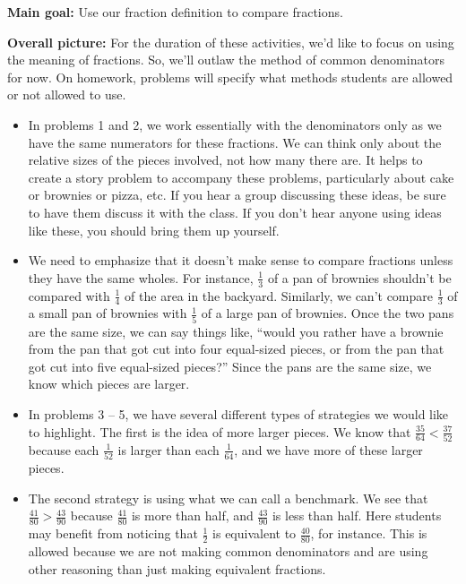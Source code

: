 \documentclass[nooutcomes,noauthor]{ximera}
\begin{document}
\newpage

\begin{instructorNotes} 



{\bf Main goal:} Use our fraction definition to compare fractions.

{\bf Overall picture:} For the duration of these activities, we'd like to focus on using the meaning of fractions. So, we'll outlaw  the method of common denominators for now. On homework, problems will specify what methods students are allowed or not allowed to use.




\begin{itemize}
	\item In problems 1 and 2, we work essentially with the denominators only as we have the same numerators for these fractions. We can think only about the relative sizes of the pieces involved, not how many there are. It helps to create a story problem to accompany these problems, particularly about cake or brownies or pizza, etc. If you hear a group discussing these ideas, be sure to have them discuss it with the class. If you don't hear anyone using ideas like these, you should bring them up yourself.
	\item We need to emphasize that it doesn't make sense to compare fractions unless they have the same wholes. For instance, $\frac13$ of a pan of brownies shouldn't be compared with $\frac14$ of the area in the backyard. Similarly, we can't compare $\frac13$ of a small pan of brownies with $\frac15$ of a large pan of brownies. Once the two pans are the same size, we can say things like, ``would you rather have a brownie from the pan that got cut into four equal-sized pieces, or from the pan that got cut into five equal-sized pieces?'' Since the pans are the same size, we know which pieces are larger.
	\item In problems 3 -- 5, we have several different types of strategies we would like to highlight. The first is the idea of more larger pieces. We know that $\frac{35}{64} < \frac{37}{52}$ because each $\frac{1}{52}$ is larger than each $\frac{1}{64}$, and we have more of these larger pieces.
	\item The second strategy is using what we can call a benchmark. We see that $\frac{41}{80} > \frac{43}{90}$ because $\frac{41}{80}$ is more than half, and $\frac{43}{90}$ is less than half. Here students may benefit from noticing that $\frac{1}{2}$ is equivalent to $\frac{40}{80}$, for instance. This is allowed because we are not making common denominators and are using other reasoning than just making equivalent fractions.

\end{itemize}
\end{instructorNotes}
\end{document}
